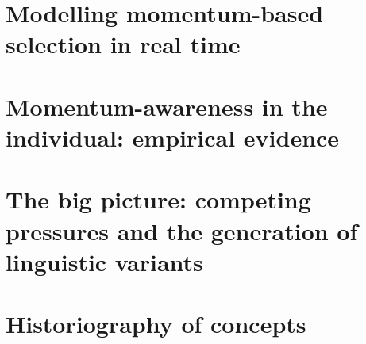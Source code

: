 \documentclass[oneside]{book}
\begin{document}
\chapter[Momentum-based selection in real time]{Modelling momentum-based selection in real time}
\label{ch:momentummodel}


\chapter[Momentum-awareness in the individual]{Momentum-awareness in the individual: empirical evidence}
\label{ch:shetland}



\chapter[Competing pressures of variation and selection]{The big picture: competing pressures and the generation of linguistic variants}
\label{ch:bigpicture}


%



\printindex

\appendix
\chapter{Historiography of concepts}
\label{app:concepts}
%
\end{document}
